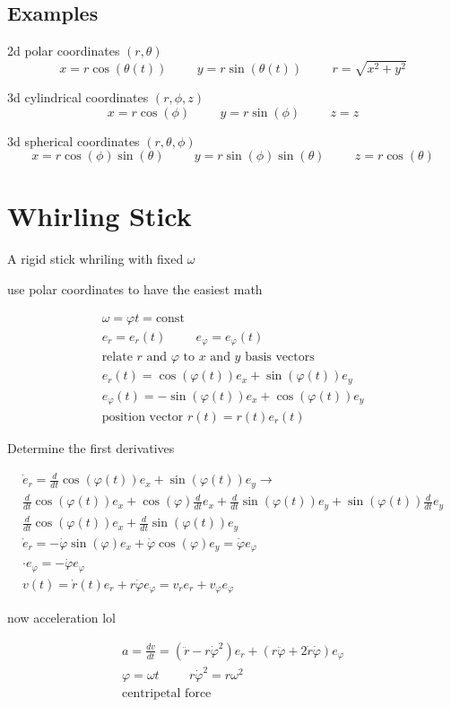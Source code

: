 \documentclass[fleqn]{report}
\newcommand{\hp}{\hspace{1cm}}
\newcommand{\equations} [1] {
\begin{gather*}
#1
\end{gather*}
}
\begin{document}
\subsection{Examples}
2d polar coordinates $(r, \theta)$
\[
x = r \cos(\theta(t)) \hp
y = r \sin(\theta(t))
\hp 
r = \sqrt{x^2 + y^2}
\]

3d cylindrical coordinates $(r, \phi, z)$
\[
x = r \cos(\phi) \hp y = r \sin(\phi) \hp z = z
\]

3d spherical coordinates $(r, \theta, \phi)$
\[
x = r \cos(\phi) \sin(\theta)
\hp 
y = r \sin(\phi) \sin(\theta)
\hp 
z = r \cos(\theta) 
\]

\section{Whirling Stick}
A rigid stick whriling with fixed $\omega$

use polar coordinates to have the easiest math 
\equations{
    \omega = \varphi t = \textrm{const}
    \\
    e_r = e_r (t) \hp e_{\varphi} = e_{\varphi} (t)
    \\
    \textrm{relate $r$ and $\varphi$ to $x$ and $y$ basis vectors}
    \\
    e_r(t) = \cos(\varphi(t)) e_x + \sin(\varphi(t))e_y
    \\
    e_{\varphi}(t) = -\sin(\varphi(t)) e_x + \cos(\varphi(t)) e_y
    \\
    \textrm{position vector } r(t) = r(t) e_r(t)
}

Determine the first derivatives
\equations{
    \dot e_r = \frac{d}{dt}\cos(\varphi(t)) e_x + \sin(\varphi(t))e_y
    \rightarrow
    \\
    \frac{d}{dt}\cos(\varphi(t)) e_x + 
    \cos(\varphi) \frac{d}{dt}e_x + 
    \frac{d}{dt} \sin(\varphi(t))e_y + 
    \sin(\varphi(t)) \frac{d}{dt} e_y
    \\
    \frac{d}{dt}\cos(\varphi(t)) e_x + 
    \frac{d}{dt} \sin(\varphi(t))e_y 
    \\
    \dot e_r = - \dot \varphi \sin(\varphi) e_x + 
    \dot \varphi \cos(\varphi) e_y = \dot \varphi e_\varphi
    \\
    \cdot e_{\varphi} = - \dot \varphi e_{\varphi}
    \\
    v(t) = \dot r(t) e_r + r \dot \varphi e_\varphi
    =
    v_r e_r + v_\varphi e_\varphi 
}

now acceleration lol
\equations{
    a = \frac{dv}{dt} = 
    (\ddot r - r \dot \varphi^2) e_r + 
    (r \ddot \varphi + 2 \dot r \dot \varphi) e_{\varphi}
    \\
    \varphi = \omega t \hp r \dot \varphi^2  = r \omega^2
    \\
    \textrm{centripetal force}
}
\end{document}
